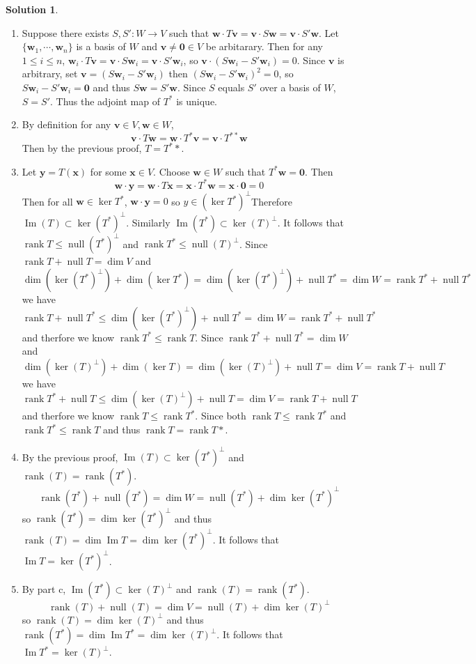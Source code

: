 \documentclass[11pt]{article}
\theoremstyle{definition}
\newtheorem*{solution}{Solution}
\DeclareMathOperator{\nul}{null}
\DeclareMathOperator{\rank}{rank}
\DeclareMathOperator{\im}{Im}
\newcommand{\vv}{\mathbf{v}}
\newcommand{\vw}{\mathbf{w}}
\newcommand{\vx}{\mathbf{x}}
\newcommand{\vy}{\mathbf{y}}
\newcommand{\vzero}{\mathbf{0}}
\begin{document}
    \begin{solution}
        \begin{enumerate}[label = \alph*)]
            \item Suppose there exists $S, S':W \to V$ such that $\vw \cdot T\vv = \vv \cdot S\vw = \vv \cdot S'\vw$. Let $\{\vw_1, \cdots, \vw_n\}$ is a basis of $W$ and $\vv \neq \vzero \in V$ be arbitarary. Then for any $1 \le i \le n$, $\vw_i \cdot T\vv = \vv \cdot S\vw_i = \vv \cdot S'\vw_i$, so $\vv \cdot (S\vw_i -S'\vw_i) = 0$. Since $\vv$ is arbitrary, set $\vv = (S\vw_i -S'\vw_i)$ then $(S\vw_i -S'\vw_i)^2 = 0$, so $S\vw_i -S'\vw_i = \vzero$ and thus $S\vw = S'\vw$. Since $S$ equals $S'$ over a basis of $W$, $S = S'$. Thus the adjoint map of $T^*$ is unique.
            \item By definition for any $\vv \in V, \vw \in W$, $$\vv \cdot T\vw = \vw \cdot T^* \vv = \vv \cdot T^{**}\vw$$Then by the previous proof, $T = T^**$.
            \item Let $\vy = T(\vx)$ for some $\vx \in V$. Choose $\vw \in W$ such that $T^*\vw = \vzero$. Then $$\vw \cdot \vy = \vw \cdot T\vx = \vx \cdot T^* \vw = \vx \cdot \vzero = 0$$Then for all $\vw \in \ker T^*$, $\vw \cdot \vy = 0$ so $y \in (\ker T^*)^{\perp}$Therefore $\im(T) \subset \ker(T^*)^{\perp}$. Similarly $\im(T^*) \subset \ker(T)^{\perp}$. It follows that $\rank T \le \nul (T^*)^{\perp}$ and $\rank T^* \le \nul (T)^{\perp}$. Since $\rank T + \nul T = \dim V$ and $$\dim(\ker (T^*)^{\perp}) + \dim(\ker T^*) = \dim(\ker (T^*)^{\perp}) + \nul T^* = \dim W = \rank T^* + \nul T^*$$we have $$\rank T + \nul T^* \le \dim(\ker (T^*)^{\perp}) + \nul T^* = \dim W = \rank T^* + \nul T^*$$and therfore we know $\rank T^* \le \rank T$. Since $\rank T^* + \nul T^* = \dim W$ and $$\dim(\ker (T)^{\perp}) + \dim(\ker T) = \dim(\ker (T)^{\perp}) + \nul T = \dim V = \rank T + \nul T$$we have $$\rank T^* + \nul T \le \dim(\ker (T)^{\perp}) + \nul T = \dim V = \rank T + \nul T$$and therfore we know $\rank T \le \rank T^*$. Since both $\rank T \le \rank T^*$ and $\rank T^* \le \rank T$ and thus $\rank T = \rank T*$.
            \item By the previous proof, $\im(T) \subset \ker(T^*)^{\perp}$ and $\rank(T) = \rank(T^*)$. $$\rank(T^*) + \nul(T^*) = \dim W = \nul(T^*) + \dim \ker(T^*)^{\perp}$$so $\rank(T^*) = \dim \ker(T^*)^{\perp}$ and thus $\rank(T) = \dim \im T = \dim \ker(T^*)^{\perp}$. It follows that $\im T = \ker(T^*)^{\perp}$.
            \item By part c, $\im(T^*) \subset \ker(T)^{\perp}$ and $\rank(T) = \rank(T^*)$. $$\rank(T) + \nul(T) = \dim V = \nul(T) + \dim \ker(T)^{\perp}$$so $\rank(T) = \dim \ker(T)^{\perp}$ and thus $\rank(T^*) = \dim \im T^* = \dim \ker(T)^{\perp}$. It follows that $\im T^* = \ker(T)^{\perp}$.

\end{enumerate}
\end{solution}
\end{document}
